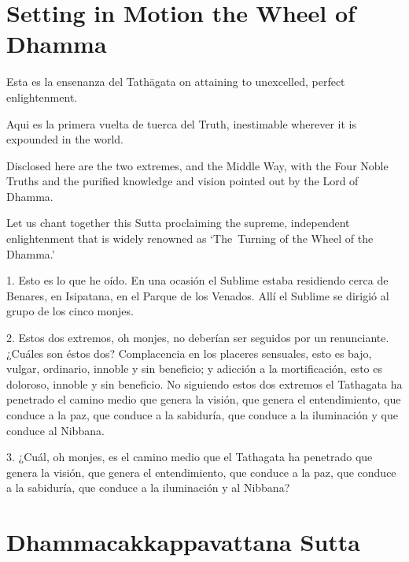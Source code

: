 \chapterTocDelegatePageNumber
\chapter{Setting in Motion the Wheel of Dhamma}

\setTocDelegatedPageNumber
\englishText
\renewcommand{\englishTitle}{Setting in Motion the Wheel of Dhamma}

\begin{leader}

Esta es la ensenanza del  Tathāgata on attaining to unexcelled,
perfect enlightenment.

Aqui es la primera vuelta de tuerca del Truth,
inestimable wherever it is expounded in the world.

Disclosed here are the two extremes, and the Middle Way, with the Four Noble
Truths and the purified knowledge and vision pointed out by the Lord of
Dhamma.

Let us chant together this Sutta proclaiming the supreme, independent
enlightenment that is widely renowned as ‘The~Turning of the Wheel of
the Dhamma.’

\end{leader}


1. Esto es lo que he oído. En una ocasión el Sublime estaba residiendo cerca de Benares, en Isipatana, en el Parque de los Venados. Allí el Sublime se dirigió al grupo de los cinco monjes.

2. Estos dos extremos, oh monjes, no deberían ser seguidos por un renunciante. ¿Cuáles son éstos dos? Complacencia en los placeres sensuales, esto es bajo, vulgar, ordinario, innoble y sin beneficio; y adicción a la mortificación, esto es doloroso, innoble y sin beneficio. No siguiendo estos dos extremos el Tathagata ha penetrado el camino medio que genera la visión, que genera el entendimiento, que conduce a la paz, que conduce a la sabiduría, que conduce a la iluminación y que conduce al Nibbana.

3. ¿Cuál, oh monjes, es el camino medio que el Tathagata ha penetrado que genera la visión, que genera el entendimiento, que conduce a la paz, que conduce a la sabiduría, que conduce a la iluminación y al Nibbana? 



\chapterTocSubIndentTrue
\chapter{Dhammacakkappavattana Sutta}

